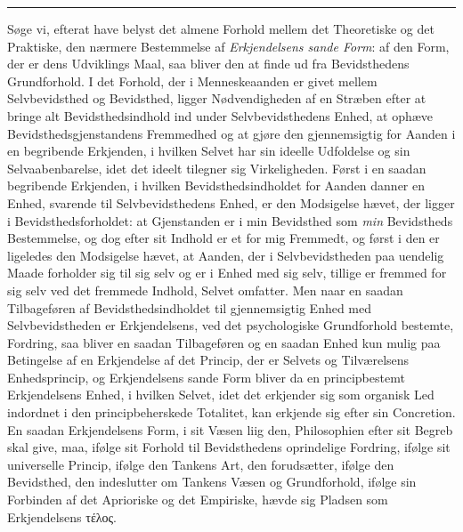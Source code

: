 \begin{center}\rule{2cm}{0.4pt}\end{center}

Søge vi, efterat have belyst det almene Forhold mellem det Theoretiske og det
Praktiske, den nærmere Bestemmelse af \emph{Erkjendelsens sande Form}: af den
Form, der er dens Udviklings Maal, saa bliver den at finde ud fra Bevidsthedens
Grundforhold. I det Forhold, der i Menneskeaanden er givet mellem
Selvbevidsthed og Bevidsthed, ligger
 Nødvendigheden af en Stræben efter at bringe alt Bevidsthedsindhold ind under
Selvbevidsthedens Enhed, at ophæve Bevidsthedsgjenstandens Fremmedhed og at
gjøre den gjennemsigtig for Aanden i en begribende Erkjenden, i hvilken Selvet
har sin ideelle Udfoldelse og sin Selvaabenbarelse, idet det ideelt tilegner sig
Virkeligheden. Først i en saadan begribende Erkjenden, i hvilken
Bevidsthedsindholdet for Aanden danner en Enhed, svarende til Selvbevidsthedens
Enhed, er den Modsigelse hævet, der ligger i Bevidsthedsforholdet: at
Gjenstanden er i min Bevidsthed som \emph{min} Bevidstheds Bestemmelse, og dog
efter sit Indhold er et for mig Fremmedt, og først i den er ligeledes den
Modsigelse hævet, at Aanden, der i Selvbevidstheden paa uendelig Maade forholder
sig til sig selv og er i Enhed med sig selv, tillige er fremmed for sig selv ved
det fremmede Indhold, Selvet omfatter.
Men naar en saadan Tilbageføren af Bevidsthedsindholdet til gjennemsigtig Enhed
med Selvbevidstheden er Erkjendelsens, ved det psychologiske Grundforhold
bestemte, Fordring, saa bliver en saadan Tilbageføren og en saadan Enhed kun
mulig paa Betingelse af en Erkjendelse af det Princip, der er Selvets og
Tilværelsens Enhedsprincip, og Erkjendelsens sande Form bliver da en
principbestemt Erkjendelsens Enhed, i hvilken Selvet, idet det erkjender sig som
organisk Led indordnet i den principbeherskede Totalitet, kan erkjende sig efter
sin Concretion. En saadan Erkjendelsens Form, i sit Væsen liig den, Philosophien
efter sit Begreb skal give, maa, ifølge sit Forhold til Bevidsthedens
oprindelige Fordring, ifølge sit universelle Princip, ifølge den Tankens Art,
den forudsætter, ifølge den Bevidsthed, den indeslutter om Tankens Væsen og
Grundforhold, ifølge sin Forbinden af det Aprioriske og det Empiriske, hævde sig
Pladsen som Erkjendelsens τέλος.

